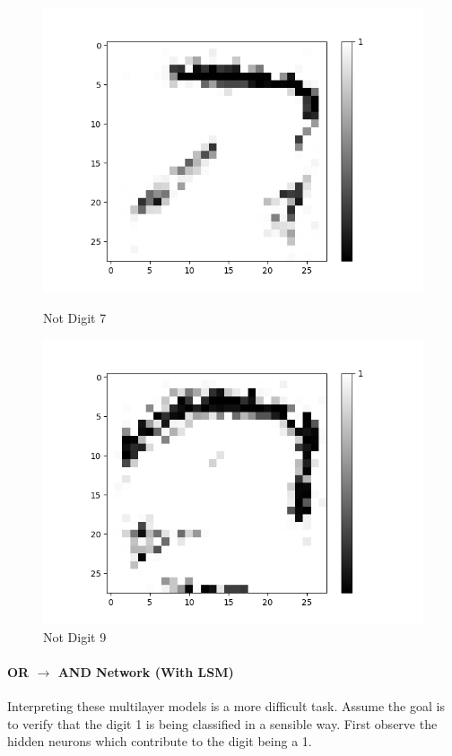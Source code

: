 \begin{figure}[H]
\begin{minipage}[b]{0.19\textwidth}
		\includegraphics[width=\textwidth]{AND(NO-LSM)/Negative/Layer0-Neuron-7.png}
		\caption{Not Digit 7}
		\label{fig:cnf-descrete-generalizatiion}
	\end{minipage}
	\begin{minipage}[b]{0.19\textwidth}
		\includegraphics[width=\textwidth]{AND(NO-LSM)/Negative/Layer0-Neuron-9.png}
		\caption{Not Digit 9}
		\label{fig:cnf-descrete-generalizatiion}
	\end{minipage}
	\hfill
\end{figure}

\paragraph{OR $\rightarrow$ AND Network (With LSM)}
Interpreting these multilayer models is a more difficult task. Assume the goal is to verify that the digit 1 is being classified in a sensible way. First observe the hidden neurons which contribute to the digit being a 1.


